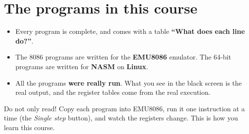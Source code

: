 \documentclass[11pt, a4paper, oneside]{report}
\begin{document}
\section*{The programs in this course}
\begin{itemize}
    \item Every program is complete, and comes with a table \textbf{``What does each line do?''}.
    \item The 8086 programs are written for the \textbf{EMU8086} emulator. The 64-bit programs are
          written for \textbf{NASM} on \textbf{Linux}.
    \item All the programs \textbf{were really run}. What you see in the black screen \faDesktop{} is the real output,
          and the register tables come from the real execution.
\end{itemize}

\begin{intabih}
    Do not only read! Copy each program into EMU8086, run it one instruction at a time
    (the \emph{Single step} button), and watch the registers change. This is how you learn this course.
\end{intabih}

\tableofcontents


%
%
%
%
%
\end{document}
